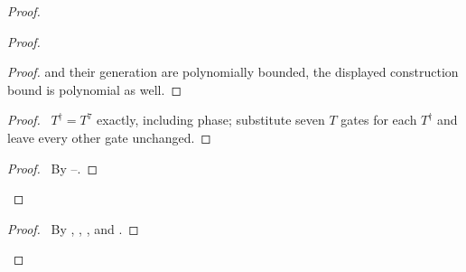 \begin{proof}
\begin{proof}
\begin{proof}
 and their generation are polynomially bounded, the displayed
 construction bound is polynomial as well.\end{proof}
 \begin{proof}\pf\ $T^\dagger=T^7$ exactly, including phase;
 substitute seven $T$ gates for each $T^\dagger$ and leave every
 other gate unchanged.\end{proof}
 \qedstep
 \begin{proof}\pf\ By --.
 \end{proof}
\end{proof}
 \qedstep
 \begin{proof}\pf\ By ,
 , , and
 .\end{proof}
\end{proof}

